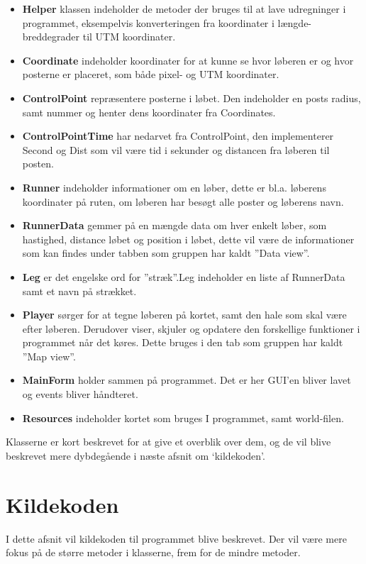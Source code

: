 \begin {itemize}
\item \textbf{Helper} klassen indeholder de metoder der bruges til at lave udregninger i programmet, eksempelvis konverteringen fra  koordinater i længde- breddegrader til UTM koordinater. 
\item \textbf{Coordinate} indeholder koordinater for at kunne se hvor løberen er og hvor posterne er placeret, som både pixel- og UTM koordinater. 
\item \textbf{ControlPoint} repræsentere posterne i løbet. Den indeholder en posts radius, samt nummer og henter dens koordinater fra Coordinates.
\item \textbf{ControlPointTime} har nedarvet fra ControlPoint, den implementerer Second og Dist som vil være tid i sekunder og distancen fra løberen til posten. 
\item \textbf{Runner} indeholder informationer om en løber, dette er bl.a. løberens koordinater på ruten, om løberen har besøgt alle poster og løberens navn.
\item \textbf{RunnerData} gemmer på en mængde data om hver enkelt løber, som hastighed, distance løbet og position i løbet, dette vil være de informationer som kan findes under tabben som gruppen har kaldt ”Data view”. 
\item \textbf{Leg} er det engelske ord for ”stræk”.Leg indeholder en liste af RunnerData samt et navn på strækket.
\item \textbf{Player} sørger for at tegne løberen på kortet, samt den hale som skal være efter løberen. Derudover viser, skjuler og opdatere den forskellige funktioner i programmet når det køres. Dette bruges i den tab som gruppen har kaldt ”Map view”.
\item \textbf{MainForm} holder sammen på programmet. Det er her GUI’en bliver lavet og events bliver håndteret.
\item \textbf{Resources} indeholder kortet som bruges I programmet, samt world-filen.
\end {itemize}

Klasserne er kort beskrevet for at give et overblik over dem, og de vil blive beskrevet mere dybdegående i næste afsnit om ‘kildekoden’.

\section{Kildekoden}
I dette afsnit vil kildekoden til programmet blive beskrevet. Der vil være mere fokus på de større metoder i klasserne, frem for de mindre metoder.

